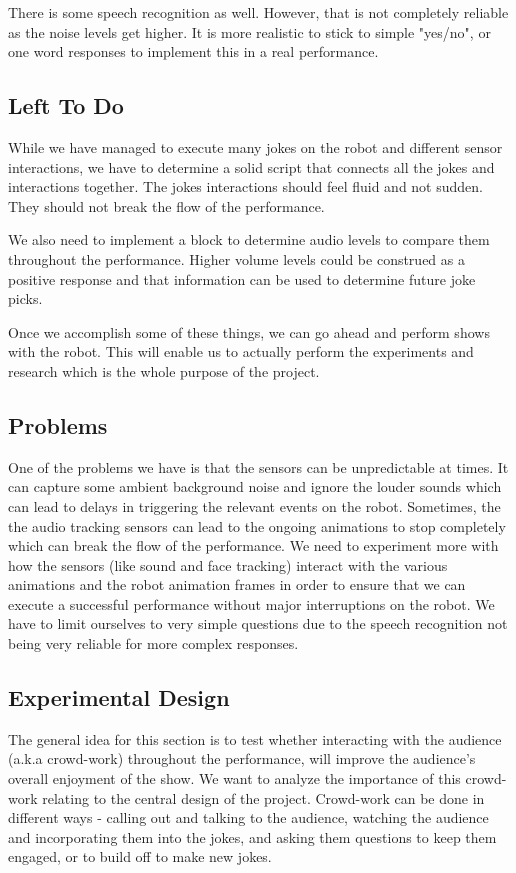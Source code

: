 \documentclass[onecolumn, draftclsnofoot,10pt, compsoc]{IEEEtran}
\begin{document}
There is some speech recognition as well. However, that is not completely reliable as the noise levels get higher. It is more realistic to stick to simple "yes/no", or one word responses to implement this in a real performance. 

\subsection{Left To Do}

While we have managed to execute many jokes on the robot and different sensor interactions, we have to determine a solid script that connects all the jokes and interactions together. The jokes interactions should feel fluid and not sudden. They should not break the flow of the performance.

We also need to implement a block to determine audio levels to compare them throughout the performance. Higher volume levels could be construed as a positive response and that information can be used to determine future joke picks. 

Once we accomplish some of these things, we can go ahead and perform shows with the robot. This will enable us to actually perform the experiments and research which is the whole purpose of the project.

\subsection{Problems}

One of the problems we have is that the sensors can be unpredictable at times. It can capture some ambient background noise and ignore the louder sounds which can lead to delays in triggering the relevant events on the robot. Sometimes, the the audio tracking sensors can lead to the ongoing animations to stop completely which can break the flow of the performance. We need to experiment more with how the sensors (like sound and face tracking) interact with the various animations and the robot animation frames in order to ensure that we can execute a successful performance without major interruptions on the robot. We have to limit ourselves to very simple questions due to the speech recognition not being very reliable for more complex responses. 

\subsection{Experimental Design}

The general idea for this section is to test whether interacting with the audience (a.k.a crowd-work) throughout the performance, will improve the audience's overall enjoyment of the show. We want to analyze the importance of this crowd-work relating to the central design of the project.
Crowd-work can be done in different ways - calling out and talking to the audience, watching the audience and incorporating them into the jokes, and asking them questions to keep them engaged, or to build off to make new jokes.
\end{document}

